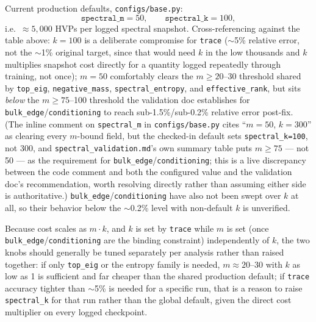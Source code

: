 \documentclass[11pt]{article}
\newcommand{\code}[1]{\texttt{#1}}
\begin{document}
Current production defaults, \code{configs/base.py}:
\[
\code{spectral_m} = 50, \qquad \code{spectral_k} = 100,
\]
i.e.\ \(\approx 5{,}000\) HVPs per logged spectral snapshot. Cross-referencing
against the table above: \(k{=}100\) is a deliberate compromise for
\code{trace} (\(\sim\)5\% relative error, not the \(\sim\)1\% original
target, since that would need \(k\) in the low thousands and \(k\) multiplies
snapshot cost directly for a quantity logged repeatedly through training,
not once); \(m{=}50\) comfortably clears the \(m\ge20\)--30 threshold shared
by \code{top_eig}, \code{negative_mass}, \code{spectral_entropy}, and
\code{effective_rank}, but sits \emph{below} the \(m\ge75\)--100 threshold
the validation doc establishes for \code{bulk_edge}/\code{conditioning} to
reach sub-1.5\%/sub-0.2\% relative error post-fix. (The inline comment on
\code{spectral_m} in \code{configs/base.py} cites ``\(m{=}50\), \(k{=}300\)''
as clearing every \(m\)-bound field, but the checked-in default sets
\code{spectral_k=100}, not 300, and \code{spectral_validation.md}'s own
summary table puts \(m\ge75\) --- not 50 --- as the requirement for
\code{bulk_edge}/\code{conditioning}; this is a live discrepancy between
the code comment and both the configured value and the validation doc's
recommendation, worth resolving directly rather than assuming either side
is authoritative.) \code{bulk_edge}/\code{conditioning} have also not been
swept over \(k\) at all, so their behavior below the $\sim$0.2\% level with
non-default \(k\) is unverified.

Because cost scales as \(m\cdot k\), and \(k\) is set by \code{trace} while
\(m\) is set (once \code{bulk_edge}/\code{conditioning} are the binding
constraint) independently of \(k\), the two knobs should generally be tuned
separately per analysis rather than raised together: if only \code{top_eig}
or the entropy family is needed, \(m\approx20\)--30 with \(k\) as low as 1 is
sufficient and far cheaper than the shared production default; if
\code{trace} accuracy tighter than \(\sim\)5\% is needed for a specific run,
that is a reason to raise \code{spectral_k} for that run rather than the
global default, given the direct cost multiplier on every logged checkpoint.
\end{document}

